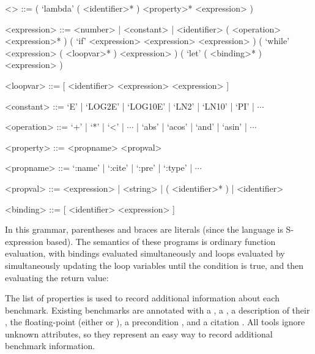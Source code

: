 \documentclass[main.tex]{subfiles}
\begin{document}
\begin{grammar}
<\core> ::= ( `lambda' ( <identifier>* ) <property>* <expression> )

<expression> ::= <number> | <constant> | <identifier>
\alt ( <operation> <expression>* )
\alt ( `if' <expression> <expression> <expression> )
\alt ( `while' <expression> ( <loopvar>* ) <expression> )
\alt ( `let' ( <binding>* ) <expression> )

<loopvar> ::= [ <identifier> <expression> <expression> ]

<constant> ::= `E' | `LOG2E' | `LOG10E' | `LN2' | `LN10' | `PI' | $\dotsb$

<operation> ::= `+' | `*' | `<' | $\dotsb$ | `abs' | `acos' | `and' | `asin' | $\dotsb$

<property> ::= <propname> <propval>

<propname> ::= `:name' | `:cite' | `:pre' | `:type' | $\dotsb$

<propval> ::= <expression> | <string> | ( <identifier>* ) | <identifier>

<binding> ::= [ <identifier> <expression> ]
\end{grammar}

In this grammar, parentheses and braces are literals
  (since the language is S-expression based).
The semantics of these programs is ordinary function evaluation,
  with  bindings evaluated simultaneously
  and  loops evaluated
  by simultaneously updating the loop variables
  until the condition is true,
  and then evaluating the return value:

\begin{mathpar}

\end{mathpar}

The list of properties is used to record additional information
  about each benchmark.
Existing benchmarks are annotated with a ,
  a , a description of their ,
  the floating-point  (either  or ),
  a precondition , and a citation .
All \name tools ignore unknown attributes,
  so they represent an easy way to record additional benchmark information.
\end{document}
